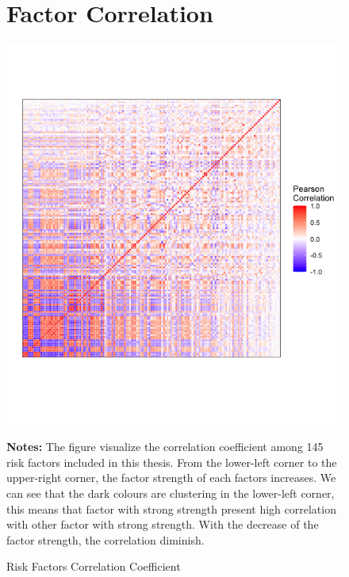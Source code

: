 
	\begin{figure}[ht]
			\section{Factor Correlation}\label{factor_correlation}
		\centering
				\caption{Risk Factors Correlation Coefficient}
		\label{figure:correlation}
		\includegraphics[scale = 0.7]{correlation_heat_map}
		\centering
				\begin{minipage}{\textwidth}
			{\footnotesize {\bf Notes:} The figure visualize the correlation coefficient among 145 risk factors included in this thesis. From the lower-left corner to the upper-right corner, the factor strength of each factors increases. We can see that the dark colours are clustering in the lower-left corner, this means that factor with strong strength present high correlation with other factor with strong strength. With the decrease of the factor strength, the correlation diminish. }
		\end{minipage}
	\end{figure}


